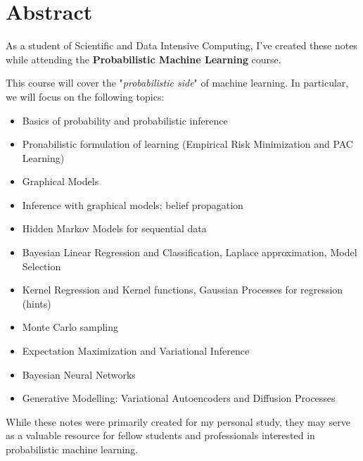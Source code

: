 \chapter*{Abstract}

As a student of Scientific and Data Intensive Computing, I've created these notes while attending the \textbf{Probabilistic Machine Learning} course.

\vspace{1em}

This course will cover the "\textit{probabilistic side}" of machine learning. In particular, we will focus on the following topics:

\begin{itemize}
    \item Basics of probability and probabilistic inference
    \item Pronabilistic formulation of learning (Empirical Risk Minimization and PAC  Learning)
    \item Graphical Models
    \item Inference with graphical models: belief propagation
    \item Hidden Markov Models for sequential data
    \item Bayesian Linear Regression and Classification, Laplace approximation, Model Selection
    \item Kernel Regression and Kernel functions, Gaussian Processes for regression (hints)
    \item Monte Carlo sampling
    \item Expectation Maximization and Variational Inference
    \item Bayesian Neural Networks
    \item Generative Modelling: Variational Autoencoders and Diffusion Processes
\end{itemize}

\vspace{1em}

While these notes were primarily created for my personal study, they may serve as a valuable resource for fellow students and professionals interested in probabilistic machine learning.